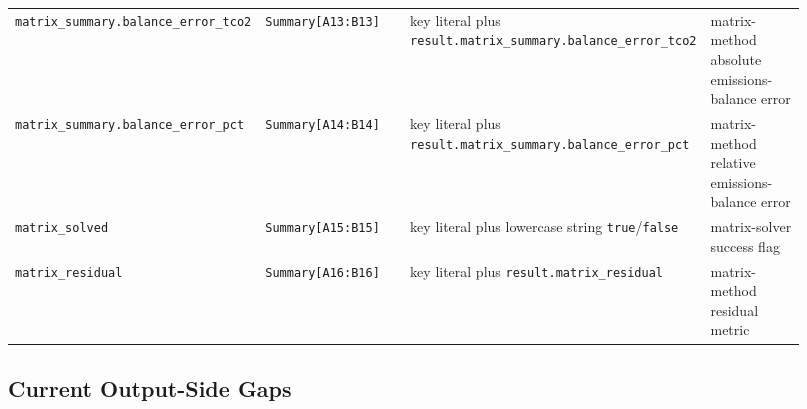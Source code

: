 \begin{longtable}{@{}L{0.17\linewidth}L{0.29\linewidth}L{0.22\linewidth}L{0.24\linewidth}@{}}
\texttt{matrix\_summary.balance\_error\_tco2} & \texttt{Summary[A13:B13]} & key literal plus \texttt{result.matrix\_summary.balance\_error\_tco2} & matrix-method absolute emissions-balance error \\
\texttt{matrix\_summary.balance\_error\_pct} & \texttt{Summary[A14:B14]} & key literal plus \texttt{result.matrix\_summary.balance\_error\_pct} & matrix-method relative emissions-balance error \\
\texttt{matrix\_solved} & \texttt{Summary[A15:B15]} & key literal plus lowercase string \texttt{true}/\texttt{false} & matrix-solver success flag \\
\texttt{matrix\_residual} & \texttt{Summary[A16:B16]} & key literal plus \texttt{result.matrix\_residual} & matrix-method residual metric \\
\bottomrule
\end{longtable}

\subsection{Current Output-Side Gaps}

